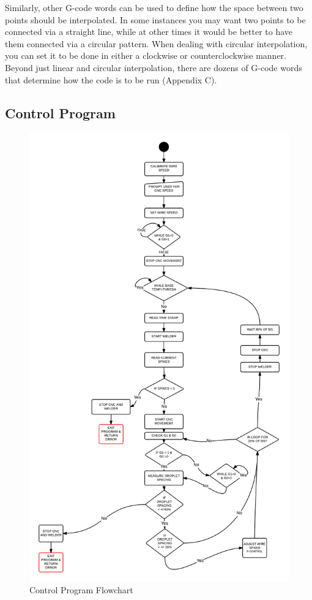\documentclass[12pt]{article}
\newlength\tindent
\renewcommand{\indent}{\hspace*{\tindent}}
\begin{document}
\indent Similarly, other G-code words can be used to define how the space between two points should be interpolated. In some instances you may want two points to be connected via a straight line, while at other times it would be better to have them connected via a circular pattern. When dealing with circular interpolation, you can set it to be done in either a clockwise or counterclockwise manner. Beyond just linear and circular interpolation, there are dozens of G-code words that determine how the code is to be run (Appendix C). 

\clearpage

\subsection{Control Program}

\begin{figure}[!h]
\centering
\includegraphics[scale=0.82]{control}
\caption{Control Program Flowchart}
\end{figure}
\end{document}
